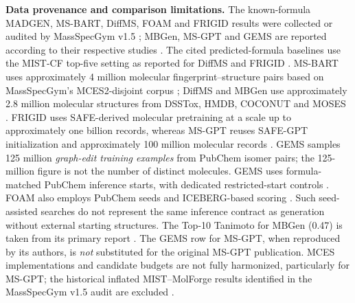 \noindent\textbf{Data provenance and comparison limitations.}
The known-formula MADGEN, MS-BART, DiffMS, FOAM and FRIGID results
were collected or audited by MassSpecGym v1.5
\citep{Liu2026MassSpecGymWild}; MBGen, MS-GPT and GEMS are
reported according to their respective studies
\citep{Sun2026MBGen,Zhao2026MSGPT,Acikalin2026GEMS}.
The cited predicted-formula baselines use the MIST-CF top-five setting
as reported for DiffMS and FRIGID \citep{Bohde2025,Bohde2026FRIGID}.
MS-BART uses approximately 4 million molecular fingerprint--structure
pairs based on MassSpecGym's MCES2-disjoint corpus
\citep{Han2025MSBART}; DiffMS and MBGen use approximately 2.8 million
molecular structures from DSSTox, HMDB, COCONUT and MOSES
\citep{Bohde2025,Sun2026MBGen}. FRIGID uses SAFE-derived molecular
pretraining at a scale up to approximately one billion records, whereas
MS-GPT reuses SAFE-GPT initialization and approximately 100 million
molecular records \citep{Bohde2026FRIGID,Zhao2026MSGPT}. GEMS
samples 125 million \emph{graph-edit training examples} from PubChem
isomer pairs; the 125-million figure is not the number of distinct
molecules. GEMS uses formula-matched PubChem inference starts, with
dedicated restricted-start controls \citep{Acikalin2026GEMS}.
FOAM also employs PubChem seeds and ICEBERG-based scoring
\citep{Manjrekar2026FOAM}. Such seed-assisted searches do not represent
the same inference contract as generation without external starting
structures. The Top-10 Tanimoto for MBGen (0.47) is taken from its
primary report \citep{Sun2026MBGen}. The GEMS row for MS-GPT, when
reproduced by its authors, is \emph{not} substituted for the original
MS-GPT publication. MCES implementations and candidate budgets are
not fully harmonized, particularly for MS-GPT; the historical
inflated MIST--MolForge results identified in the MassSpecGym v1.5
audit are excluded \citep{Liu2026MassSpecGymWild}.

